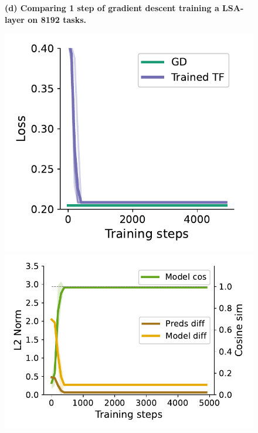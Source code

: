 \documentclass{article}
\theoremstyle{plain}
\theoremstyle{definition}
\theoremstyle{remark}
\begin{document}
\begin{figure}
\textbf{(d) Comparing 1 step of gradient descent training a LSA-layer on 8192 tasks.}
\begin{center}
\begin{minipage}{.24\textwidth}
  \centering
  \begin{center}
    \includegraphics[width=1.\textwidth]{Final_figures/cycle/8192/train.pdf}
  \end{center}
  \vspace{-10pt}
\end{minipage}
\begin{minipage}{.24\textwidth}
  \centering
  \begin{center}
    \includegraphics[width=1.\textwidth]{Final_figures/cycle/8192/sim.pdf}

\end{center}
\end{minipage}
\end{center}
\end{figure}
\end{document}
